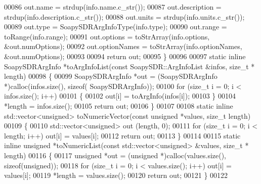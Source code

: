 \begin{DoxyCode}
00086     out.name = strdup(info.name.c\_str());
00087     out.description = strdup(info.description.c\_str());
00088     out.units = strdup(info.units.c\_str());
00089     out.type = SoapySDRArgInfoType(info.type);
00090     out.range = toRange(info.range);
00091     out.options = toStrArray(info.options, &out.numOptions);
00092     out.optionNames = toStrArray(info.optionNames, &out.numOptions);
00093 
00094     \textcolor{keywordflow}{return} out;
00095 \}
00096 
00097 \textcolor{keyword}{static} \textcolor{keyword}{inline} SoapySDRArgInfo *toArgInfoList(\textcolor{keyword}{const} SoapySDR::ArgInfoList &infos, \textcolor{keywordtype}{size\_t} *
      length)
00098 \{
00099     SoapySDRArgInfo *out = (SoapySDRArgInfo *)calloc(infos.size(), \textcolor{keyword}{sizeof}(
      SoapySDRArgInfo));
00100     \textcolor{keywordflow}{for} (\textcolor{keywordtype}{size\_t} i = 0; i < infos.size(); i++)
00101     \{
00102         out[i] = toArgInfo(infos[i]);
00103     \}
00104     *length = infos.size();
00105     \textcolor{keywordflow}{return} out;
00106 \}
00107 
00108 \textcolor{keyword}{static} \textcolor{keyword}{inline} std::vector<unsigned> toNumericVector(\textcolor{keyword}{const} \textcolor{keywordtype}{unsigned} *values, \textcolor{keywordtype}{size\_t} 
      length)
00109 \{
00110     std::vector<unsigned> out (length, 0);
00111     \textcolor{keywordflow}{for} (\textcolor{keywordtype}{size\_t} i = 0; i < length; i++) out[i] = values[i];
00112     \textcolor{keywordflow}{return} out;
00113 \}
00114 
00115 \textcolor{keyword}{static} \textcolor{keyword}{inline} \textcolor{keywordtype}{unsigned} *toNumericList(\textcolor{keyword}{const} std::vector<unsigned> &values, \textcolor{keywordtype}{size\_t} *
      length)
00116 \{
00117     \textcolor{keywordtype}{unsigned} *out = (\textcolor{keywordtype}{unsigned} *)calloc(values.size(), \textcolor{keyword}{sizeof}(unsigned));
00118     \textcolor{keywordflow}{for} (\textcolor{keywordtype}{size\_t} i = 0; i < values.size(); i++) out[i] = values[i];
00119     *length = values.size();
00120     \textcolor{keywordflow}{return} out;
00121 \}
00122 
\end{DoxyCode}
